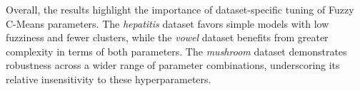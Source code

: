 Overall, the results highlight the importance of dataset-specific tuning of Fuzzy C-Means parameters. The \textit{hepatitis} dataset favors simple models with low fuzziness and fewer clusters, while the \textit{vowel} dataset benefits from greater complexity in terms of both parameters. The \textit{mushroom} dataset demonstrates robustness across a wider range of parameter combinations, underscoring its relative insensitivity to these hyperparameters.


